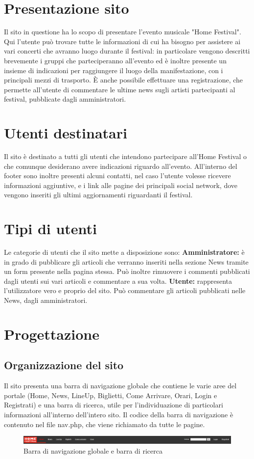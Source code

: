 \documentclass[10pt, a4paper]{article}
\begin{document}
\newpage
\hypersetup{hidelinks}
\tableofcontents
\newpage
\section{Presentazione sito}
Il sito in questione ha lo scopo di presentare l'evento musicale "Home Festival". Qui l'utente può trovare tutte le informazioni di cui ha bisogno per assistere ai vari concerti che avranno luogo durante il festival: in particolare vengono descritti brevemente i gruppi che parteciperanno all'evento ed è inoltre presente un insieme di indicazioni per raggiungere il luogo della manifestazione, con i principali mezzi di trasporto.
È anche possibile effettuare una registrazione, che permette all'utente di commentare le ultime news sugli artisti partecipanti al festival, pubblicate dagli amministratori.
\section{Utenti destinatari}
Il sito è destinato a tutti gli utenti che intendono partecipare all’Home Festival o che comunque desiderano avere indicazioni riguardo all’evento.  
All’interno del footer sono inoltre presenti alcuni contatti, nel caso l’utente volesse ricevere informazioni aggiuntive, e i link alle pagine dei principali social network, dove vengono inseriti gli ultimi aggiornamenti riguardanti il festival.
\section{Tipi di utenti}
Le categorie di utenti che il sito mette a disposizione sono:
\newline \textbf{Amministratore: }è in grado di pubblicare gli articoli che verranno inseriti nella sezione News tramite un form presente nella pagina stessa. Può inoltre rimuovere i commenti pubblicati dagli utenti sui vari articoli e commentare a sua volta.
\newline \textbf{Utente: }rappresenta l'utilizzatore vero e proprio del sito. Può commentare gli articoli pubblicati nelle News, dagli amministratori.
\section{Progettazione}
\subsection{Organizzazione del sito}
Il sito presenta una barra di navigazione globale che contiene le varie aree del portale (Home, News, LineUp, Biglietti, Come Arrivare, Orari, Login e Registrati) e una barra di ricerca, utile per l'individuazione di particolari informazioni all'interno dell'intero sito.
Il codice della barra di navigazione è contenuto nel file nav.php, che viene richiamato da tutte le pagine.
\begin{figure}[h!]
  \centering
  \includegraphics[width=1\textwidth]{Images/navbar.png}
  \caption{Barra di navigazione globale e barra di ricerca}
  \label{fig:navbar}
\end{figure}
\newpage
\end{document}
